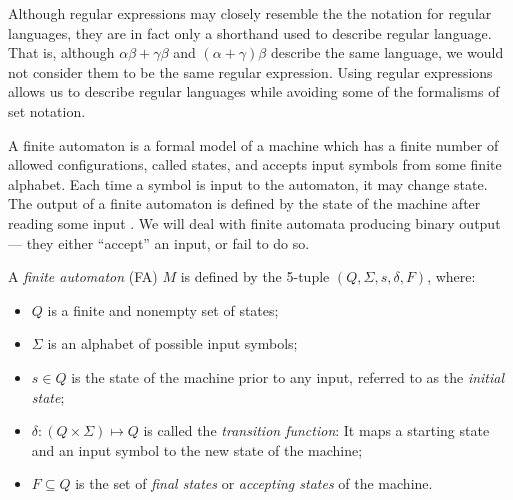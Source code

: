 \documentclass{bcthesis}
\renewcommand{\meo}[1]{}
\newcommand{\footcite}[2]{\xspace\cite[pg.~{#2}]{#1}\xspace}
\begin{document}
	\begin{remark}
		Although regular expressions may closely resemble the the notation for regular languages, they are in fact only a shorthand used to describe regular language. 
		That is, although $\alpha \beta + \gamma \beta$ and $(\alpha + \gamma) \beta$ describe the same language, we would not consider them to be the same regular expression.
		Using regular expressions allows us to describe regular languages while avoiding some of the formalisms of set notation.
		\meo{
			Is this a convincing reason why this is a thing worth having?
			Maybe mention that a language is regular if and only if it can be described by a regular expression.
		}

	\end{remark}

	\meo{
		I could mention here that regular expressions are an example of a grammar, shockingly belonging to the class of regular grammars.
	}


\label{ch:finite_automata}

	A finite automaton is a formal model of a machine which has a finite number of allowed configurations, called states, and accepts input symbols from some finite alphabet. 
	Each time a symbol is input to the automaton, it may change state. 
	The output of a finite automaton is defined by the state of the machine after reading some input \footcite{hopcroft}{13}.
	We will deal with finite automata producing binary output --- they either ``accept'' an input, or fail to do so.

	\begin{definition}
		A \textit{finite automaton} (FA) $M$ is defined by the 5-tuple $(Q, \Sigma, s, \delta, F)$, where:
		\begin{itemize}
			\item [] $Q$ is a finite and nonempty set of states;
			\item [] $\Sigma$ is an alphabet of possible input symbols;
			\item [] $s \in Q$ is the state of the machine prior to any input, referred to as the \textit{initial state};
			\item [] $\delta: (Q \times \Sigma) \mapsto Q$ is called the \textit{transition function}: It maps a starting state and an input symbol to the new state of the machine;
			\item [] $F \subseteq Q$ is the set of \textit{final states} or \textit{accepting states} of the machine.
		\end{itemize}
		\footcite{hopcroft}{17}~\meo{todo: something about this citation}
	\end{definition}
\end{document}
